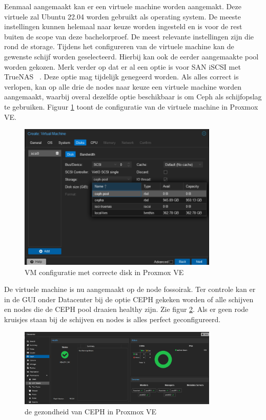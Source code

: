 Eenmaal aangemaakt kan er een virtuele machine worden aangemakt. Deze virtuele zal Ubuntu 22.04 worden gebruikt als operating system.
De meeste instellingen kunnen helemaal naar keuze worden ingesteld en is voor de rest buiten de scope van deze bachelorproef. De meest relevante instellingen zijn die rond de storage.
Tijdens het configureren van de virtuele machine kan de gewenste schijf worden geselecteerd. Hierbij kan ook de eerder aangemaakte pool worden gekozen.
Merk verder op dat er al een optie is voor SAN iSCSI met TrueNAS~\autocite{truenas} . Deze optie mag tijdelijk genegeerd worden.
Als alles correct is verlopen, kan op alle drie de nodes naar keuze een virtuele machine worden aangemaakt, waarbij overal dezelfde optie beschikbaar is om Ceph als schijfopslag te gebruiken.
Figuur \ref{fig:vm-storage-proxmox} toont de configuratie van de virtuele machine in Proxmox VE.
\begin{figure}[H]
  \centering
  \includegraphics[width=0.85\textwidth]{../poc/vm-storage-prox.png}
  \caption{VM configuratie met correcte disk in Proxmox VE}
  \label{fig:vm-storage-proxmox}
\end{figure}

De virtuele machine is nu aangemaakt op de node fossoirak.
Ter controle kan er in de GUI onder Datacenter bij de optie CEPH gekeken worden of alle schijven en nodes die de CEPH pool draaien healthy zijn. Zie figur \ref{fig:ceph-healthy-prox}.
Als er geen rode kruisjes staan bij de schijven en nodes is alles perfect geconfigureerd.
\begin{figure}[H]
  \centering
  \includegraphics[width=0.85\textwidth]{../poc/ceph-healthy-prox.png}
  \caption{de gezondheid van CEPH  in Proxmox VE}
  \label{fig:ceph-healthy-prox}
\end{figure}

